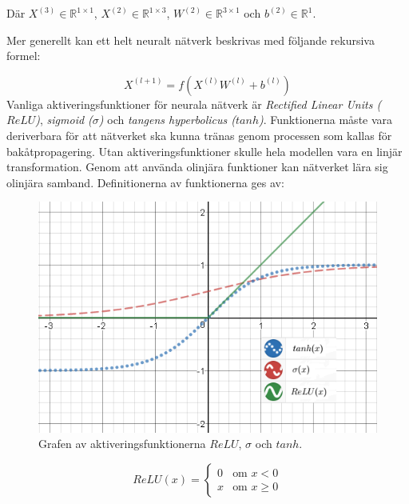 \documentclass[a4paper,11pt,twoside]{article}
\begin{document}
Där $X^{(3)} \in \mathbb{R}^{1 \times 1}$, $X^{(2)} \in \mathbb{R}^{1 \times 3}$, $W^{(2)} \in \mathbb{R}^{3 \times 1}$ och $b^{(2)} \in \mathbb{R}^{1}$.

Mer generellt kan ett helt neuralt nätverk beskrivas med följande rekursiva formel: \cite{cs231n} \cite{wikiStanford}

\begin{equation}\label{feed-forward}
X^{(l+1)} = f(X^{(l)}W^{(l)} +b^{(l)})
\end{equation}
Vanliga aktiveringsfunktioner för neurala nätverk är \textit{Rectified Linear Units ($ReLU$)}, \textit{sigmoid ($\sigma$)} och \textit{tangens hyperbolicus ($tanh$)}. Funktionerna måste vara deriverbara för att nätverket ska kunna tränas genom processen som kallas för bakåtpropagering. Utan aktiveringsfunktioner skulle hela modellen vara en linjär transformation. Genom att använda olinjära funktioner kan nätverket lära sig olinjära samband. Definitionerna av funktionerna ges av: \cite{cs231n} 

\begin{figure}[h]\label{aktiveringsfunktion}
	\centering
  		\includegraphics[scale=0.8]{activationfunction.png}
  	\caption{Grafen av aktiveringsfunktionerna $ReLU$, $\sigma$ och $tanh$.}
\end{figure}

\begin{equation}
ReLU(x) = \begin{cases} 
			0 & \mbox{om } x < 0 \\ 
			x & \mbox{om } x \geq 0 
		\end{cases}
\end{equation}
\end{document}
